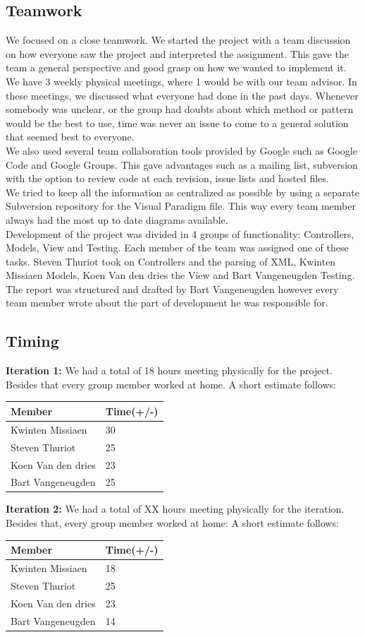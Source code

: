 		\subsection{Teamwork}
		We focused on a close teamwork. We started the project with a team discussion on how everyone saw the project and interpreted the assignment. This gave the team a general perspective and good grasp on how we wanted to implement it.\\
		We have 3 weekly physical meetings, where 1 would be with our team advisor. In these meetings, we discussed what everyone had done in the past days. Whenever somebody was unclear, or the group had doubts about which method or pattern would be the best to use, time was never an issue to come to a general solution that seemed best to everyone.\\
		We also used several team collaboration tools provided by Google such as Google Code and Google Groups. This gave advantages such as a mailing list, subversion with the option to review code at each revision, issue lists and hosted files.\\
		We tried to keep all the information as centralized as possible by using a separate Subversion repository for the Visual Paradigm file. This way every team member always had the most up to date diagrams available.\\
		Development of the project was divided in 4 groups of functionality: Controllers, Models, View and Testing. Each member of the team was assigned one of these tasks. Steven Thuriot took on Controllers and the parsing of XML, Kwinten Missiaen Models, Koen Van den dries the View and Bart Vangeneugden Testing. The report was structured and drafted by Bart Vangeneugden however every team member wrote about the part of development he was responsible for.\\
		\subsection{Timing}
		\textbf{Iteration 1:}
		We had a total of 18 hours meeting physically for the project. Besides that every group member worked at home. A short estimate follows:\\
		 \begin{tabular}{l|l}
		Member & Time(+/-)\\ \hline
		Kwinten Missiaen & 30\\
		Steven Thuriot & 25\\
		Koen Van den dries & 23\\
		Bart Vangeneugden & 25\\
		\end{tabular}
		\textbf{Iteration 2:}
		We had a total of XX hours meeting physically for the iteration. Besides that, every group member worked at home: A short estimate follows:
		\begin{tabular}{l|l}
		Member & Time(+/-)\\ \hline
		Kwinten Missiaen & 18\\
		Steven Thuriot & 25\\
		Koen Van den dries & 23\\
		Bart Vangeneugden & 14\\
		\end{tabular}
